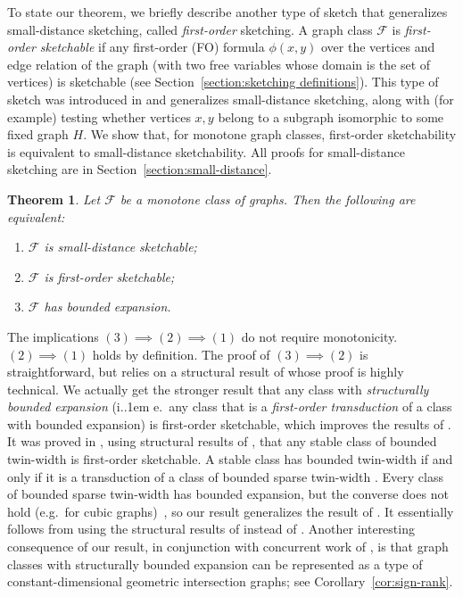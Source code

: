\documentclass[11pt]{article}
\newcommand*\ie{i.\kern.1em e.\ }
\newtheorem{thm}{Theorem}[section]
\theoremstyle{definition}
\def\F {{\mathcal F}}
\begin{document}
To state our theorem, we briefly describe another type of sketch that generalizes small-distance
sketching, called \emph{first-order} sketching. A graph class $\F$ is \emph{first-order sketchable}
if any first-order (FO) formula $\phi(x,y)$ over the vertices and edge relation of the graph (with
two free variables whose domain is the set of vertices) is sketchable (see
Section~\ref{section:sketching definitions}). This type of sketch was introduced in \cite{HWZ21} and
generalizes small-distance sketching, along with (for example) testing whether vertices $x,y$ belong
to a subgraph isomorphic to some fixed graph $H$. We show that, for monotone graph classes,
first-order sketchability is equivalent to small-distance sketchability.  All proofs for
small-distance sketching are in Section~\ref{section:small-distance}.  

\begin{thm}
\label{thm:intro small-distance}
Let $\F$ be a monotone class of graphs. Then the following are equivalent:
\begin{enumerate}[itemsep=0pt]
\item $\F$ is small-distance sketchable;
\item $\F$ is first-order sketchable;
\item $\F$ has bounded expansion.
\end{enumerate}
\end{thm}
\noindent
The implications $(3) \implies (2) \implies (1)$ do not require monotonicity.  $(2) \implies (1)$
holds by definition.  The proof of $(3) \implies (2)$ is straightforward, but relies on a structural
result of \cite{GKN+20} whose proof is highly technical. We actually get the stronger result that
any class with \emph{structurally bounded expansion} (\ie any class that is a \emph{first-order
transduction} of a class with bounded expansion) is first-order sketchable, which improves the
results of \cite{HWZ21}. It was proved in \cite{HWZ21}, using structural results of \cite{GPT21},
that any stable class of bounded twin-width is first-order sketchable. A stable class has bounded
twin-width if and only if it is a transduction of a class of bounded sparse twin-width \cite{GPT21}.
Every class of bounded sparse twin-width has bounded expansion, but the converse does not hold
(e.g.~for cubic graphs)~\cite{BGK+21}, so our result generalizes the result of \cite{HWZ21}. It
essentially follows from using the structural results of \cite{GKN+20} instead of \cite{GPT21}.
Another interesting consequence of our result, in conjunction with concurrent work of \cite{HHP+22},
is that graph classes with structurally bounded expansion can be represented as a type of
constant-dimensional geometric intersection graphs; see Corollary~\ref{cor:sign-rank}.
\end{document}
